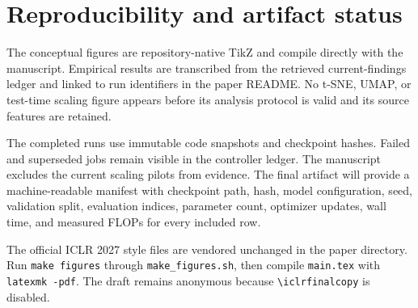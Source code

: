 \section{Reproducibility and artifact status}

The conceptual figures are repository-native TikZ and compile directly with the manuscript. Empirical results are transcribed from the retrieved current-findings ledger and linked to run identifiers in the paper README. No t-SNE, UMAP, or test-time scaling figure appears before its analysis protocol is valid and its source features are retained.

The completed runs use immutable code snapshots and checkpoint hashes. Failed and superseded jobs remain visible in the controller ledger. The manuscript excludes the current scaling pilots from evidence. The final artifact will provide a machine-readable manifest with checkpoint path, hash, model configuration, seed, validation split, evaluation indices, parameter count, optimizer updates, wall time, and measured FLOPs for every included row.

The official ICLR 2027 style files are vendored unchanged in the paper directory. Run \texttt{make figures} through \texttt{make\_figures.sh}, then compile \texttt{main.tex} with \texttt{latexmk -pdf}. The draft remains anonymous because \texttt{\textbackslash iclrfinalcopy} is disabled.
